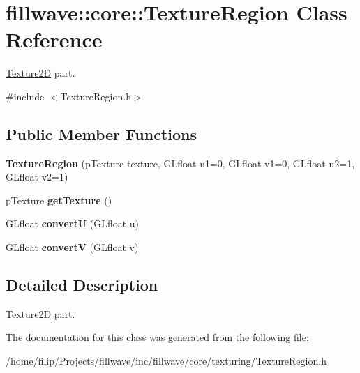 \hypertarget{classfillwave_1_1core_1_1TextureRegion}{}\section{fillwave\+:\+:core\+:\+:Texture\+Region Class Reference}
\label{classfillwave_1_1core_1_1TextureRegion}


\hyperlink{classfillwave_1_1core_1_1Texture2D}{Texture2\+D} part.  




{\ttfamily \#include $<$Texture\+Region.\+h$>$}

\subsection*{Public Member Functions}
\begin{DoxyCompactItemize}
\item 
\hypertarget{classfillwave_1_1core_1_1TextureRegion_a44754e912c10f1f6eb2227d69e669d39}{}{\bfseries Texture\+Region} (p\+Texture texture, G\+Lfloat u1=0, G\+Lfloat v1=0, G\+Lfloat u2=1, G\+Lfloat v2=1)\label{classfillwave_1_1core_1_1TextureRegion_a44754e912c10f1f6eb2227d69e669d39}

\item 
\hypertarget{classfillwave_1_1core_1_1TextureRegion_ac959f0067097e8f446348e60d9493615}{}p\+Texture {\bfseries get\+Texture} ()\label{classfillwave_1_1core_1_1TextureRegion_ac959f0067097e8f446348e60d9493615}

\item 
\hypertarget{classfillwave_1_1core_1_1TextureRegion_a77dcf85e3c886108bb370e199fe4a893}{}G\+Lfloat {\bfseries convert\+U} (G\+Lfloat u)\label{classfillwave_1_1core_1_1TextureRegion_a77dcf85e3c886108bb370e199fe4a893}

\item 
\hypertarget{classfillwave_1_1core_1_1TextureRegion_aaa89038c9703c193f479eb045e589458}{}G\+Lfloat {\bfseries convert\+V} (G\+Lfloat v)\label{classfillwave_1_1core_1_1TextureRegion_aaa89038c9703c193f479eb045e589458}

\end{DoxyCompactItemize}


\subsection{Detailed Description}
\hyperlink{classfillwave_1_1core_1_1Texture2D}{Texture2\+D} part. 

The documentation for this class was generated from the following file\+:\begin{DoxyCompactItemize}
\item 
/home/filip/\+Projects/fillwave/inc/fillwave/core/texturing/Texture\+Region.\+h\end{DoxyCompactItemize}
